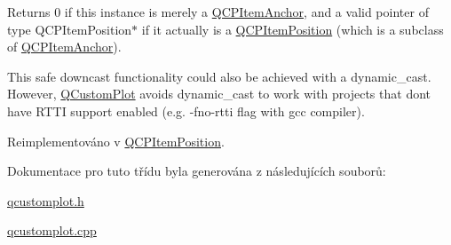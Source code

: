 Returns 0 if this instance is merely a \hyperlink{classQCPItemAnchor}{Q\+C\+P\+Item\+Anchor}, and a valid pointer of type Q\+C\+P\+Item\+Position$\ast$ if it actually is a \hyperlink{classQCPItemPosition}{Q\+C\+P\+Item\+Position} (which is a subclass of \hyperlink{classQCPItemAnchor}{Q\+C\+P\+Item\+Anchor}). 

This safe downcast functionality could also be achieved with a dynamic\+\_\+cast. However, \hyperlink{classQCustomPlot}{Q\+Custom\+Plot} avoids dynamic\+\_\+cast to work with projects that don\textquotesingle{}t have R\+T\+T\+I support enabled (e.\+g. -\/fno-\/rtti flag with gcc compiler). 

Reimplementováno v \hyperlink{classQCPItemPosition_a577a7efc601df85a20b3e709d1ac320e}{Q\+C\+P\+Item\+Position}.



Dokumentace pro tuto třídu byla generována z následujících souborů\+:\begin{DoxyCompactItemize}
\item 
\hyperlink{qcustomplot_8h}{qcustomplot.\+h}\item 
\hyperlink{qcustomplot_8cpp}{qcustomplot.\+cpp}\end{DoxyCompactItemize}
